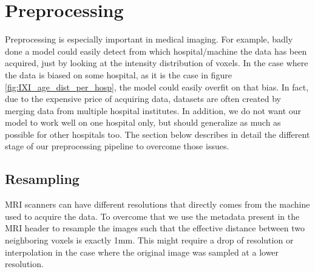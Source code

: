 \section{Preprocessing}
Preprocessing is especially important in medical imaging. For example, badly done a model could easily detect from which hospital/machine the data has been acquired, just by looking at the intensity distribution of voxels. In the case where the data is biased on some hospital, as it is the case in figure \ref{fig:IXI_age_dist_per_hosp},  the model could easily overfit on that bias. In fact, due to the expensive price of acquiring data, datasets are often created by merging data from multiple hospital institutes. In addition, we do not want our model to work well on one hospital only, but should generalize as much as possible for other hospitals too. The section below describes in detail the different stage of our preprocessing pipeline to overcome those issues.


\subsection{Resampling}
MRI scanners can have different resolutions that directly comes from the machine used to acquire the data. To overcome that we use the metadata present in the MRI header to resample the images such that the effective distance between two neighboring voxels is exactly 1mm. This might require a drop of resolution or interpolation in the case where the original image was sampled at a lower resolution.


